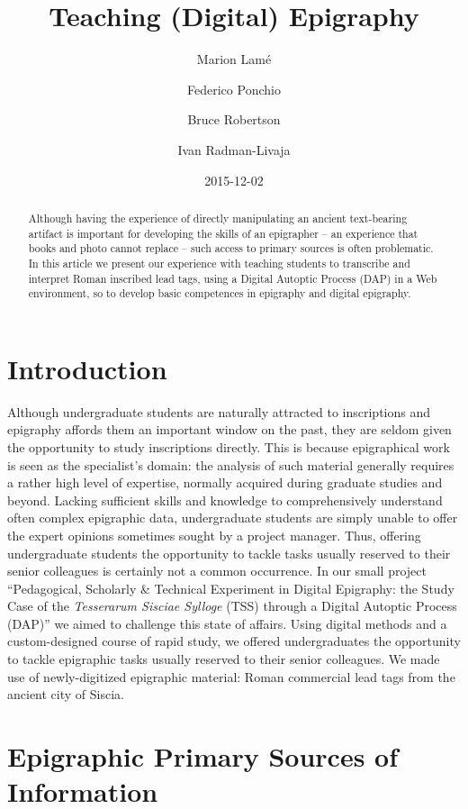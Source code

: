 \documentclass[amsthm,ebook]{saparticle}
\title{Teaching (Digital) Epigraphy}
\author[ilc]{Marion Lamé\corref{first}}
\author[isti]{Federico Ponchio}
\author[mau]{Bruce Robertson}
\author[zag]{Ivan Radman-Livaja}
\date{2015-12-02}
\begin{document}
\maketitle
\begin{abstract}
Although having the experience of directly manipulating an ancient text-bearing artifact is important for developing the
skills of an epigrapher – an experience that books and photo cannot replace – such access to primary sources is often
problematic. In this article we present our experience with teaching students to transcribe and interpret Roman
inscribed lead tags, using a Digital Autoptic Process (DAP) in a Web environment, so to develop basic competences in
epigraphy and digital epigraphy.
\end{abstract}

\section{Introduction}

Although undergraduate students are naturally attracted to inscriptions and epigraphy affords them an important window
on the past, they are seldom given the opportunity to study inscriptions directly. This is because epigraphical work is
seen as the specialist’s domain: the analysis of such material generally requires a rather high level of expertise,
normally acquired during graduate studies and beyond. Lacking sufficient skills and knowledge to comprehensively
understand often complex epigraphic data, undergraduate students are simply unable to offer the expert opinions
sometimes sought by a project manager. Thus, offering undergraduate students the opportunity to tackle tasks usually
reserved to their senior colleagues is certainly not a common occurrence. In our small project ``Pedagogical,
Scholarly \& Technical Experiment in Digital Epigraphy: the Study Case of the \emph{Tesserarum Sisciae Sylloge} (TSS) through
a Digital Autoptic Process (DAP)'' we aimed to challenge this state of affairs. Using digital methods and a
custom-designed course of rapid study, we offered undergraduates the opportunity to tackle epigraphic tasks usually
reserved to their senior colleagues. We made use of newly-digitized epigraphic material: Roman commercial lead tags
from the ancient city of Siscia.

\section{Epigraphic Primary Sources of Information}
\end{document}
